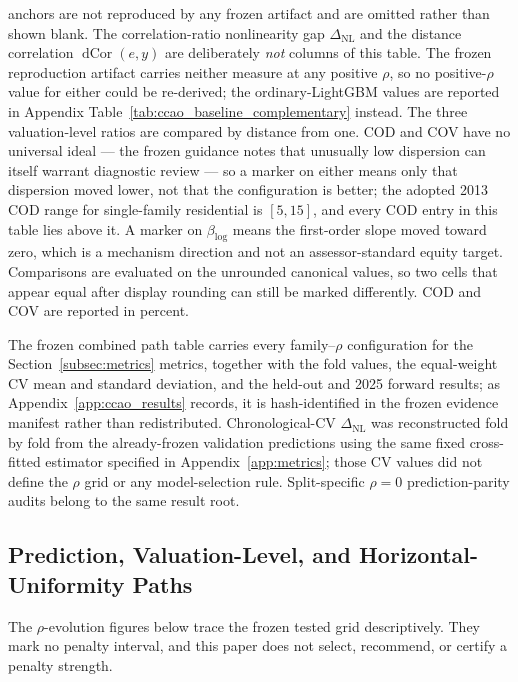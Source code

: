 \documentclass[10pt]{article}
\theoremstyle{definition}
\newcommand{\1}{\mathbf{1}}
\begin{document}
\begin{table}[!htbp]
\begin{minipage}{\textwidth}
anchors are not reproduced by any frozen artifact and are omitted rather than shown blank.
The correlation-ratio nonlinearity gap $\Delta_{\mathrm{NL}}$ and the distance correlation
$\operatorname{dCor}(e,y)$ are deliberately \emph{not} columns of this table. The frozen reproduction
artifact carries neither measure at any positive $\rho$, so no positive-$\rho$ value for either could
be re-derived; the ordinary-LightGBM values are reported in Appendix
Table~\ref{tab:ccao_baseline_complementary} instead.
The three valuation-level ratios are compared by distance from one. COD and COV have no universal
ideal --- the frozen guidance notes that unusually low dispersion can itself warrant diagnostic review
--- so a marker on either means only that dispersion moved lower, not that the configuration is
better; the adopted 2013 COD range for single-family residential is $[5,15]$, and every COD entry in
this table lies above it. A marker on $\beta_{\log}$ means the first-order slope moved toward zero,
which is a mechanism direction and not an assessor-standard equity target. Comparisons are evaluated
on the unrounded canonical values, so two cells that appear equal after display rounding can still be
marked differently. COD and COV are reported in percent.
\end{minipage}
\end{table}


The frozen combined path table carries every family--$\rho$ configuration for the Section~\ref{subsec:metrics} metrics, together with the fold values, the equal-weight CV mean and standard deviation, and the held-out and 2025 forward results; as Appendix~\ref{app:ccao_results} records, it is hash-identified in the frozen evidence manifest rather than redistributed. Chronological-CV $\Delta_{\mathrm{NL}}$ was reconstructed fold by fold from the already-frozen validation predictions using the same fixed cross-fitted estimator specified in Appendix~\ref{app:metrics}; those CV values did not define the $\rho$ grid or any model-selection rule. Split-specific $\rho=0$ prediction-parity audits belong to the same result root.


\subsection{Prediction, Valuation-Level, and Horizontal-Uniformity Paths}


The $\rho$-evolution figures below trace the frozen tested grid descriptively. They mark no penalty interval, and this paper does not select, recommend, or certify a penalty strength.
\end{document}
